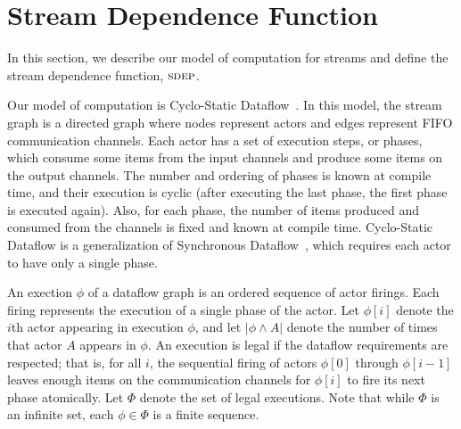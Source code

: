 \newcommand{\la}{$\leftarrow$}
\newcommand{\IND}{\begin{ALC@g}}
\newcommand{\UND}{\end{ALC@g}}
\newcommand{\tup}[2]{\langle{#1}, {#2}\rangle}

\section{Stream Dependence Function}

In this section, we describe our model of computation for streams and
define the stream dependence function, $\textsc{sdep}$.

Our model of computation is Cyclo-Static Dataflow~\cite{BELP96}.  In
this model, the stream graph is a directed graph where nodes represent
actors and edges represent FIFO communication channels.  Each actor
has a set of execution steps, or phases, which consume some items from
the input channels and produce some items on the output channels.  The
number and ordering of phases is known at compile time, and their
execution is cyclic (after executing the last phase, the first phase
is executed again).  Also, for each phase, the number of items
produced and consumed from the channels is fixed and known at compile
time.
Cyclo-Static Dataflow is a generalization of Synchronous
Dataflow~\cite{LM87-i}, which requires each actor to have only a
single phase.

An exection $\phi$ of a dataflow graph is an ordered sequence of actor
firings.  Each firing represents the execution of a single phase of
the actor.  Let $\phi[i]$ denote the $i$th actor appearing in
execution $\phi$, and let $|\phi \wedge A|$ denote the number of times
that actor $A$ appears in $\phi$.  An execution is legal if the
dataflow requirements are respected; that is, for all $i$, the
sequential firing of actors $\phi[0]$ through $\phi[i-1]$ leaves
enough items on the communication channels for $\phi[i]$ to fire its
next phase atomically.  Let $\Phi$ denote the set of legal executions.
Note that while $\Phi$ is an infinite set, each $\phi \in \Phi$ is a
finite sequence.

